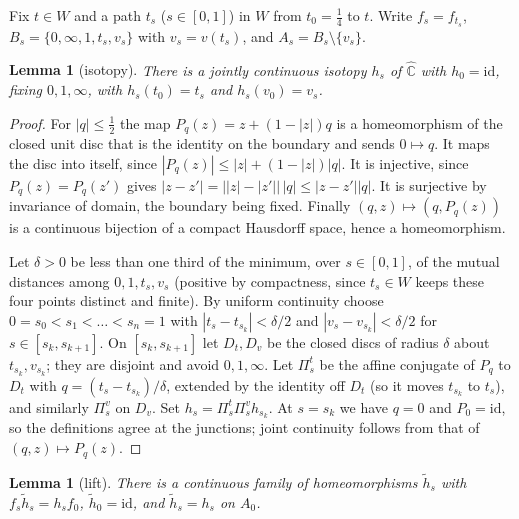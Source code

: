 \documentclass[11pt]{article}
\newtheorem{lemma}[proposition]{Lemma}
\theoremstyle{definition}
\newcommand{\Ch}{\hat{\mathbb C}}
\begin{document}
Fix $t\in W$ and a path $t_s$ ($s\in[0,1]$) in $W$ from $t_0=\tfrac14$ to $t$. Write $f_s=f_{t_s}$, $B_s=\{0,\infty,1,t_s,v_s\}$ with $v_s=v(t_s)$, and $A_s=B_s\setminus\{v_s\}$.

\begin{lemma}[isotopy]\label{lem:isotopy}
There is a jointly continuous isotopy $h_s$ of $\Ch$ with $h_0=\mathrm{id}$, fixing $0,1,\infty$, with $h_s(t_0)=t_s$ and $h_s(v_0)=v_s$.
\end{lemma}

\begin{proof}
For $|q|\le\tfrac12$ the map $P_q(z)=z+(1-|z|)q$ is a homeomorphism of the closed unit disc that is the identity on the boundary and sends $0\mapsto q$. It maps the disc into itself, since $|P_q(z)|\le|z|+(1-|z|)|q|$. It is injective, since $P_q(z)=P_q(z')$ gives $|z-z'|=\bigl||z|-|z'|\bigr|\,|q|\le|z-z'||q|$. It is surjective by invariance of domain, the boundary being fixed. Finally $(q,z)\mapsto(q,P_q(z))$ is a continuous bijection of a compact Hausdorff space, hence a homeomorphism.

Let $\delta>0$ be less than one third of the minimum, over $s\in[0,1]$, of the mutual distances among $0,1,t_s,v_s$ (positive by compactness, since $t_s\in W$ keeps these four points distinct and finite). By uniform continuity choose $0=s_0<s_1<\dots<s_n=1$ with $|t_s-t_{s_k}|<\delta/2$ and $|v_s-v_{s_k}|<\delta/2$ for $s\in[s_k,s_{k+1}]$. On $[s_k,s_{k+1}]$ let $D_t,D_v$ be the closed discs of radius $\delta$ about $t_{s_k},v_{s_k}$; they are disjoint and avoid $0,1,\infty$. Let $\Pi^t_s$ be the affine conjugate of $P_q$ to $D_t$ with $q=(t_s-t_{s_k})/\delta$, extended by the identity off $D_t$ (so it moves $t_{s_k}$ to $t_s$), and similarly $\Pi^v_s$ on $D_v$. Set $h_s=\Pi^t_s\Pi^v_s h_{s_k}$. At $s=s_k$ we have $q=0$ and $P_0=\mathrm{id}$, so the definitions agree at the junctions; joint continuity follows from that of $(q,z)\mapsto P_q(z)$.
\end{proof}

\begin{lemma}[lift]\label{lem:liftiso}
There is a continuous family of homeomorphisms $\tilde h_s$ with $f_s\tilde h_s=h_sf_0$, $\tilde h_0=\mathrm{id}$, and $\tilde h_s=h_s$ on $A_0$.
\end{lemma}
\end{document}
